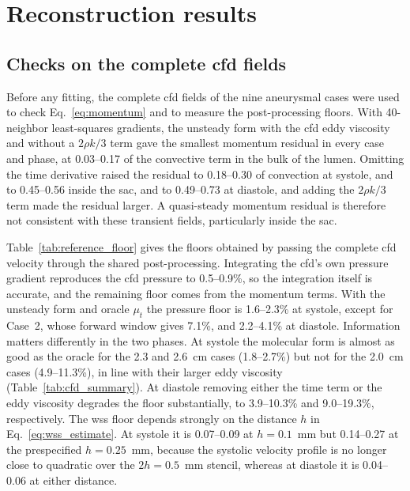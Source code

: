 \documentclass[12pt,a4paper]{article}
\newcommand{\CFD}{\ac{cfd}\xspace}
\newcommand{\WSS}{\ac{wss}\xspace}
\theoremstyle{definition}
\numberwithin{equation}{section}
\begin{document}


\section{Reconstruction results}
\label{sec:reconstruction_results}
\subsection{Checks on the complete \texorpdfstring{\CFD}{CFD} fields}
\label{sec:reference_results}
Before any fitting, the complete \CFD fields of the nine aneurysmal cases were used to check Eq.~\eqref{eq:momentum} and to measure the post-processing floors. With 40-neighbor least-squares gradients, the unsteady form with the \CFD eddy viscosity and without a $2\rho k/3$ term gave the smallest momentum residual in every case and phase, at 0.03--0.17 of the convective term in the bulk of the lumen. Omitting the time derivative raised the residual to 0.18--0.30 of convection at systole, and to 0.45--0.56 inside the sac, and to 0.49--0.73 at diastole, and adding the $2\rho k/3$ term made the residual larger. A quasi-steady momentum residual is therefore not consistent with these transient fields, particularly inside the sac.

Table~\ref{tab:reference_floor} gives the floors obtained by passing the complete \CFD velocity through the shared post-processing. Integrating the \CFD's own pressure gradient reproduces the \CFD pressure to 0.5--0.9\%, so the integration itself is accurate, and the remaining floor comes from the momentum terms. With the unsteady form and oracle $\mu_t$ the pressure floor is 1.6--2.3\% at systole, except for Case~2, whose forward window gives 7.1\%, and 2.2--4.1\% at diastole. Information matters differently in the two phases. At systole the molecular form is almost as good as the oracle for the 2.3 and 2.6~cm cases (1.8--2.7\%) but not for the 2.0~cm cases (4.9--11.3\%), in line with their larger eddy viscosity (Table~\ref{tab:cfd_summary}). At diastole removing either the time term or the eddy viscosity degrades the floor substantially, to 3.9--10.3\% and 9.0--19.3\%, respectively. The \WSS floor depends strongly on the distance $h$ in Eq.~\eqref{eq:wss_estimate}. At systole it is 0.07--0.09 at $h=0.1$~mm but 0.14--0.27 at the prespecified $h=0.25$~mm, because the systolic velocity profile is no longer close to quadratic over the $2h=0.5$~mm stencil, whereas at diastole it is 0.04--0.06 at either distance.
\end{document}

